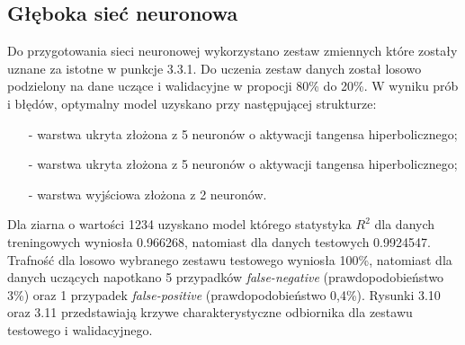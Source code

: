 \newpage
\subsection{Głęboka sieć neuronowa}

Do przygotowania sieci neuronowej wykorzystano zestaw zmiennych które zostały uznane za istotne w punkcje 3.3.1. Do uczenia zestaw danych został losowo podzielony na dane uczące i walidacyjne w propocji 80\% do 20\%. W wyniku prób i błędów, optymalny model uzyskano przy następującej strukturze:

\begin{itemize}
	\item [-] warstwa ukryta złożona z 5 neuronów o aktywacji tangensa hiperbolicznego;
	\item [-] warstwa ukryta złożona z 5 neuronów o aktywacji tangensa hiperbolicznego;
	\item [-] warstwa wyjściowa złożona z 2 neuronów.
\end{itemize}

Dla ziarna o wartości 1234 uzyskano model którego statystyka $R^{2}$ dla danych treningowych wyniosła 0.966268, natomiast dla danych testowych 0.9924547. Trafność dla losowo wybranego zestawu testowego wyniosła 100\%, natomiast dla danych uczących napotkano 5 przypadków \textit{false-negative} (prawdopodobieństwo 3\%) oraz 1 przypadek \textit{false-positive} (prawdopodobieństwo 0,4\%). Rysunki 3.10 oraz 3.11 przedstawiają krzywe charakterystyczne odbiornika dla zestawu testowego i walidacyjnego.

